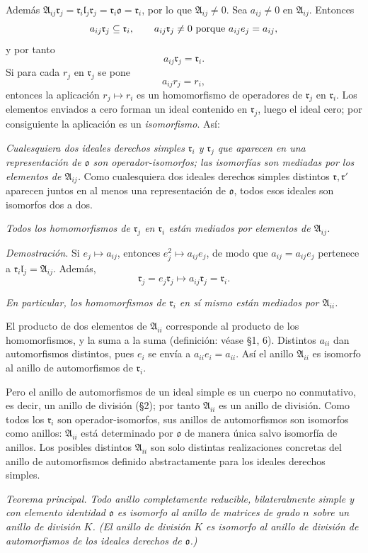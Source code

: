 \documentclass[11pt]{article}
\providecommand{\mA}{\mathfrak{A}}
\providecommand{\mo}{\mathfrak{o}}
\providecommand{\ml}{\mathfrak{l}}
\providecommand{\mr}{\mathfrak{r}}
\begin{document}
Además $\mA_{ij}\mr_j=\mr_i\ml_j\mr_j=\mr_i\mo=\mr_i$, por lo que $\mA_{ij}\ne0$. Sea $a_{ij}\ne0$ en $\mA_{ij}$. Entonces
\[
        a_{ij}\mr_j\subseteq\mr_i,
        \qquad
        a_{ij}\mr_j\ne0 \hbox{ porque } a_{ij}e_j=a_{ij},
\]
y por tanto
\[
        a_{ij}\mr_j=\mr_i.
\]
Si para cada $r_j$ en $\mr_j$ se pone
\[
        a_{ij}r_j=r_i,
\]
entonces la aplicación $r_j\mapsto r_i$ es un homomorfismo de operadores de $\mr_j$ en $\mr_i$. Los elementos enviados a cero forman un ideal contenido en $\mr_j$, luego el ideal cero; por consiguiente la aplicación es un \emph{isomorfismo}. Así:

\emph{Cualesquiera dos ideales derechos simples $\mr_i$ y $\mr_j$ que aparecen en una representación de $\mo$ son operador-isomorfos; las isomorfías son mediadas por los elementos de $\mA_{ij}$.} Como cualesquiera dos ideales derechos simples distintos $\mr,\mr'$ aparecen juntos en al menos una representación de $\mo$, todos esos ideales son isomorfos dos a dos.

\emph{Todos los homomorfismos de $\mr_j$ en $\mr_i$ están mediados por elementos de $\mA_{ij}$.}

\emph{Demostración.} Si $e_j\mapsto a_{ij}$, entonces $e_j^2\mapsto a_{ij}e_j$, de modo que $a_{ij}=a_{ij}e_j$ pertenece a $\mr_i\ml_j=\mA_{ij}$. Además,
\[
        \mr_j=e_j\mr_j\mapsto a_{ij}\mr_j=\mr_i.
\]

\emph{En particular, los homomorfismos de $\mr_i$ en sí mismo están mediados por $\mA_{ii}$.}

El producto de dos elementos de $\mA_{ii}$ corresponde al producto de los homomorfismos, y la suma a la suma (definición: véase §1, 6). Distintos $a_{ii}$ dan automorfismos distintos, pues $e_i$ se envía a $a_{ii}e_i=a_{ii}$. Así el anillo $\mA_{ii}$ es isomorfo al anillo de automorfismos de $\mr_i$.

Pero el anillo de automorfismos de un ideal simple es un cuerpo no conmutativo, es decir, un anillo de división (§2); por tanto $\mA_{ii}$ es un anillo de división. Como todos los $\mr_i$ son operador-isomorfos, sus anillos de automorfismos son isomorfos como anillos: $\mA_{ii}$ está determinado por $\mo$ de manera única salvo isomorfía de anillos. Los posibles distintos $\mA_{ii}$ son solo distintas realizaciones concretas del anillo de automorfismos definido abstractamente para los ideales derechos simples.

\emph{Teorema principal. Todo anillo completamente reducible, bilateralmente simple y con elemento identidad $\mo$ es isomorfo al anillo de matrices de grado $n$ sobre un anillo de división $K$. (El anillo de división $K$ es isomorfo al anillo de división de automorfismos de los ideales derechos de $\mo$.)}
\end{document}
